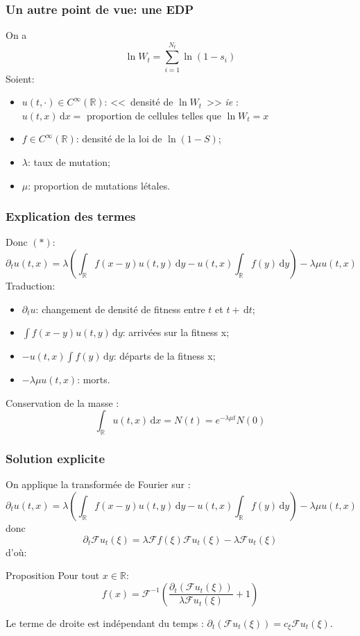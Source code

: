 \documentclass{beamer}
\newcommand{\prop}[1]{\begin{block}{Proposition}#1\end{block}}
\newcommand{\pth}[1]{\left(#1\right)}
\newcommand{\ie}{\emph{ie} }
\newcommand{\de}{\,\text{d}}
\newcommand{\Er}{\mathbb{R}}
\newcommand{\dr}{\partial}
\newcommand{\fr}{\mathcal{F}}
\begin{document}
\begin{frame}
  \frametitle{Un autre point de vue: une EDP}

  On a \[\ln W_t=\sum_{i=1}^{N_t}\ln(1-s_i)\]
  Soient:
\begin{itemize}[label=$\bullet$]
\item $u(t,\cdot)\in C^{\infty}(\Er)$: <<~densité de $\ln W_t$~>> \ie: \\$u(t,x)\de x=$ proportion de cellules telles que $\ln W_t=x$%
\item $f\in C^{\infty}(\Er)$: densité de la loi de $\ln(1-S)$;
\item $\lambda$: taux de mutation;
\item $\mu$: proportion de mutations létales.
\end{itemize}

\end{frame}
\begin{frame}
  \frametitle{Explication des termes}

Donc $(*)$:
\[\dr_tu(t,x)=\lambda\pth{\int_{\Er}f(x-y)u(t,y)\de y-u(t,x)\int_{\Er}f(y)\de y}-\lambda\mu u(t,x)\] 
Traduction:
\begin{itemize}[label=$\bullet$]
\item $\dr_tu$: changement de densité de fitness entre $t$ et $t+\de t$;
\item $\int f(x-y)u(t,y)\de y$: arrivées sur la fitness x;
\item $-u(t,x)\int f(y)\de y$: départs de la fitness x;
\item $-\lambda\mu u(t,x)$: morts.
\end{itemize} 

\vspace{0.5cm}\pause

Conservation de la masse : $$\int_{\Er} u(t,x)\de x=N(t)=e^{-\lambda\mu t}N(0)$$

\end{frame}


\begin{frame}
  \frametitle{Solution explicite}
  On applique la transformée de Fourier sur :
  \[\dr_tu(t,x)=\lambda\pth{\int_{\Er}f(x-y)u(t,y)\de y-u(t,x)\int_{\Er}f(y)\de y}-\lambda\mu u(t,x)\]
  donc
  \[\dr_t\fr u_t(\xi)=\lambda \fr f(\xi)\fr u_t(\xi)-\lambda\fr u_t(\xi)\]
  \pause
  d'où:
\prop{
    Pour tout $x\in\mathbb{R}$:
    \[f(x)=\fr^{-1}\pth{\frac{\dr_t\pth{\fr u_t(\xi)}}{\lambda\fr u_t(\xi)}+1}\]%
}
\pause
Le terme de droite est indépendant du temps : $\dr_t(\fr u_t(\xi))=c_{\xi}\fr u_t(\xi)$.

\end{frame}
\end{document}
